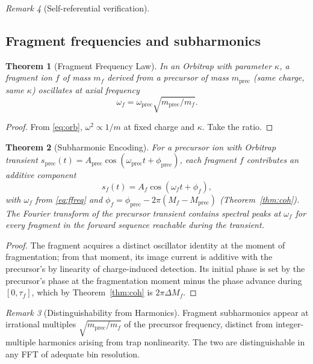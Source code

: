 \documentclass[twocolumn,10pt,a4paper]{article}
\theoremstyle{thmstyle}
\newtheorem{theorem}{Theorem}[section]
\theoremstyle{definition}
\theoremstyle{remark}
\newtheorem{remark}[theorem]{Remark}
\begin{document}
\begin{remark}[Self-referential verification]
\subsection{Fragment frequencies and subharmonics}

\begin{theorem}[Fragment Frequency Law]
\label{thm:ffreq}
In an Orbitrap with parameter $\kappa$, a fragment ion $f$ of mass
$m_{f}$ derived from a precursor of mass $m_{\mathrm{prec}}$ (same
charge, same $\kappa$) oscillates at axial frequency
\begin{equation}
\omega_{f}=\omega_{\mathrm{prec}}\sqrt{m_{\mathrm{prec}}/m_{f}}.
\label{eq:ffreq}
\end{equation}
\end{theorem}

\begin{proof}
From \eqref{eq:orb}, $\omega^{2}\propto 1/m$ at fixed charge and
$\kappa$. Take the ratio.
\end{proof}

\begin{theorem}[Subharmonic Encoding]
\label{thm:sub}
For a precursor ion with Orbitrap transient
$s_{\mathrm{prec}}(t)=A_{\mathrm{prec}}\cos(\omega_{\mathrm{prec}}t+\phi_{\mathrm{prec}})$,
each fragment $f$ contributes an additive component
\begin{equation}
s_{f}(t)=A_{f}\cos(\omega_{f}t+\phi_{f}),
\label{eq:sub}
\end{equation}
with $\omega_{f}$ from \eqref{eq:ffreq} and
$\phi_{f}=\phi_{\mathrm{prec}}-2\pi(M_{f}-M_{\mathrm{prec}})$
(Theorem~\ref{thm:coh}). The Fourier transform of the precursor
transient contains spectral peaks at $\omega_{f}$ for every fragment
in the forward sequence reachable during the transient.
\end{theorem}

\begin{proof}
The fragment acquires a distinct oscillator identity at the moment of
fragmentation; from that moment, its image current is additive with
the precursor's by linearity of charge-induced detection. Its initial
phase is set by the precursor's phase at the fragmentation moment
minus the phase advance during $[0,\tau_{f}]$, which by
Theorem~\ref{thm:coh} is $2\pi\Delta M_{f}$.
\end{proof}

\begin{remark}[Distinguishability from Harmonics]
\label{rem:harm}
Fragment subharmonics appear at irrational multiples
$\sqrt{m_{\mathrm{prec}}/m_{f}}$ of the precursor frequency, distinct
from integer-multiple harmonics arising from trap nonlinearity. The
two are distinguishable in any FFT of adequate bin resolution.
\end{remark}


\end{remark}
\end{document}
